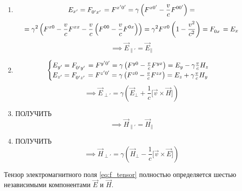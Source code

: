 \documentclass{article}
\begin{document}
\begin{enumerate}
    \item
    \begin{equation*}
        E_{x'}=\tensor{F}{_{0'}_{x'}}=\tensor{F}{^{x'}^{0'}}=\gamma\left(\tensor{F}{^{x}^{0'}}-\frac{v}{c}\tensor{F}{^{0}^{0'}}\right)=
    \end{equation*}
    \begin{equation*}
        =\gamma^2\left(\tensor{F}{^{x}^{0}}-\frac{v}{c}\tensor{F}{^{x}^{x}}-\frac{v}{c}\left(\tensor{F}{^{0}^{0}}-\frac{v}{c}\tensor{F}{^{0}^{x}}\right)\right)=\gamma^2\tensor{F}{^{x}^{0}}\left(1-\frac{v^2}{c^2}\right)=\tensor{F}{_{0}_{x}}=E_x
    \end{equation*}
    \begin{equation*}
        \implies \vec{E}_{\parallel'}=\vec{E}_\parallel
    \end{equation*}
    
    \item
    \begin{equation*}
        \begin{cases}
        E_{y'}=\tensor{F}{_{0'}_{y'}}=\tensor{F}{^{y'}^{0'}}=\gamma\left(\tensor{F}{^{y}^{0}}-\frac{v}{c}\tensor{F}{^{y}^{x}}\right)=E_y-\gamma\frac{v}{c}H_z\\
        E_{z'}=\tensor{F}{_{0'}_{z'}}=\tensor{F}{^{z'}^{0'}}=\gamma\left(\tensor{F}{^{z}^{0}}-\frac{v}{c}\tensor{F}{^{z}^{x}}\right)=E_z+\gamma\frac{v}{c}H_y
        \end{cases}
    \end{equation*}
    \begin{equation*}
        \implies
        \vec{E}_{\perp'}=\gamma\left(\vec{E}_\perp+\frac{1}{c}\lbrack\vec{v}\times\vec{H}\rbrack\right)
    \end{equation*}
    
    \item ПОЛУЧИТЬ
    \begin{equation*}
        \implies \vec{H}_{\parallel'}=\vec{H}_\parallel
    \end{equation*}
    
    \item ПОЛУЧИТЬ
    \begin{equation*}
        \implies \vec{H}_{\perp'}=\gamma\left(\vec{H}_\perp-\frac{1}{c}\lbrack\vec{v}\times\vec{E}\rbrack\right)
    \end{equation*}
\end{enumerate}

Тензор электромагнитного поля \eqref{eq:f_tensor} полностью определяется шестью независимыми компонентами $\vec{E}$ и $\vec{H}$.
\end{document}

